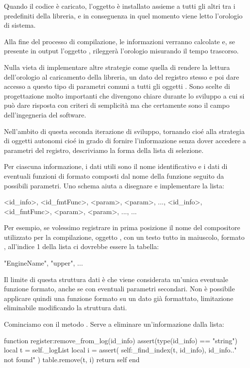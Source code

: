 Quando il codice è caricato, l'oggetto  è installato assieme a
tutti gli altri tra i predefiniti della libreria, e in conseguenza in quel
momento viene letto l'orologio di sistema. 

Alla fine del processo di compilazione, le informazioni verranno calcolate e,
se presente in output l'oggetto , rileggerà l'orologio
misurando il tempo trascorso.

Nulla vieta di implementare altre strategie come quella di rendere la lettura
dell'orologio al caricamento della libreria, un dato del registro stesso e poi
dare accesso a questo tipo di parametri comuni a tutti gli oggetti .
Sono scelte di progettazione molto importanti che divengono chiare durante lo
sviluppo a cui si può dare risposta con criteri di semplicità ma che certamente
sono il campo dell'ingegneria del software.

Nell'ambito di questa seconda iterazione di sviluppo, tornando cioé alla
strategia di oggetti  autonomi cioé in grado di fornire l'informazione
senza dover accedere a parametri del registro, descriviamo la forma
della lista di selezione.

Per ciascuna informazione, i dati utili sono il nome identificativo e i dati di
eventuali funzioni di formato composti dal nome della funzione seguito da
possibili parametri. Uno schema aiuta a disegnare e implementare la lista:
\begin{lines}
{
    { <id_info>, <id_fmtFunc>, <param>, <param>, ...},
    { <id_info>, <id_fmtFunc>, <param>, <param>, ...},
    ...
}
\end{lines}

Per esempio, se volessimo registrare in prima posizione il nome del compositore
utilizzato per la compilazione, oggetto , con un testo tutto in
maiuscolo, formato , all'indice 1 della lista  ci
dovrebbe essere la tabella:
\begin{lines}
{
    {"EngineName", "upper"},
    ...
}
\end{lines}

Il limite di questa struttura dati è che viene considerata un'unica eventuale
funzione formato, anche se con eventuali parametri secondari. Non è possibile
applicare quindi una funzione formato su un dato già formattato, limitazione
eliminabile modificando la struttura dati.

Cominciamo con il metodo . Serve a eliminare
un'informazione dalla lista:
\begin{lines}
function register:remove_from_log(id_info)
    assert(type(id_info) == "string")
    local t = self._logList
    local i = assert(
        self:_find_index(t, id_info), id_info.." not found"
    )
    table.remove(t, i)
    return self
end
\end{lines}

